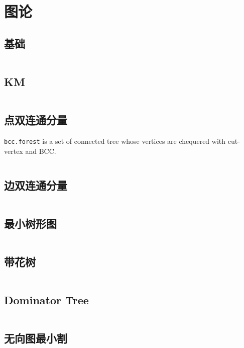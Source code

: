 \chapter{图论}
\section{基础}
\inputminted{cpp}{\source/graph-theory/basis.cpp}
\section{KM}
\inputminted{cpp}{\source/graph-theory/KM.cpp}
\section{点双连通分量}
\texttt{bcc.forest} is a set of connected tree whose vertices are chequered with cut-vertex and BCC.
\inputminted{cpp}{\source/graph-theory/biconnected-graph-vertex.cpp}
\section{边双连通分量}
\inputminted{cpp}{\source/graph-theory/biconnected-graph-edge.cpp}
\section{最小树形图}
\inputminted{cpp}{\source/graph-theory/optimum-branching.cpp}
\section{带花树}
\inputminted{cpp}{\source/graph-theory/blossom-algorithm.cpp}
\section{Dominator Tree}
\inputminted{cpp}{\source/graph-theory/dominator-tree.cpp}
\section{无向图最小割}
\inputminted{cpp}{\source/graph-theory/stoer-wagner-algorithm.cpp}
